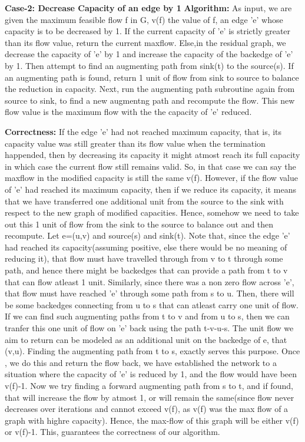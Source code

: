 \documentclass{article}
\newcommand\algo{\vspace{.10in}\textbf{Algorithm: }}
\newcommand\correctness{\vspace{.10in}\textbf{Correctness: }}
\begin{document}
    \textbf {Case-2: Decrease Capacity of an edge by 1} \newline    
    \algo As input, we are given the maximum feasible flow f in G, v(f) the value of f, an edge 'e' whose capacity is to be decreased by 1. If the current capacity of 'e' is strictly greater than its flow value, return the current maxflow. Else,in the residual graph, we decrease the capacity of 'e' by 1 and increase the capacity of the backedge of 'e' by 1. Then attempt to find an augmenting path from sink(t) to the source(s). If an augmenting path is found, return 1 unit of flow from sink to source to balance the reduction in capacity. Next, run the augmenting path subroutine again from source to sink, to find a new augmentng path and recompute the flow. This new flow value is the maximum flow with the the capacity of 'e' reduced. \newline

    \correctness If the edge 'e' had not reached maximum capacity, that is, its capacity value was still greater than its flow value when the termination happended, then by decreasing its capacity it might atmost reach its full capacity in which case the current flow still remains valid. So, in that case we can say the maxflow in the modified capacity is still the same v(f). However, if the flow value of 'e' had reached its maximum capacity, then if we reduce its capacity, it means that we have transferred one additional unit from the source to the sink with respect to the new graph of modified capacities. Hence, somehow we need to take out this 1 unit of flow from the sink to the source to balance out and then recompute. Let e=(u,v) and source(s) and sink(t). Note that, since the edge 'e' had reached its capacity(assuming positive, else there would be no meaning of reducing it), that flow must have travelled through from v to t through some path, and hence there might be backedges that can provide a path from t to v that can flow atleast 1 unit. Similarly, since there was a non zero flow across 'e', that flow must have reached 'e' through some path from s to u. Then, there will be some backedges connecting from u to s that can atleast carry one unit of flow. If we can find such augmenting paths from t to v and from u to s, then we can tranfer this one unit of flow on 'e' back using the path t-v-u-s. The unit flow we aim to return can be modeled as an additional unit on the backedge of e, that (v,u). Finding the augmenting path from t to s, exactly serves this purpose. Once , we do this and return the flow back, we have established the network to a situation where the capacity of 'e' is reduced by 1, and the flow would have been v(f)-1. Now we try finding a forward augmenting path from s to t, and if found, that will increase the flow by atmost 1, or will remain the same(since flow never decreases over iterations and cannot exceed v(f), as v(f) was the max flow of a graph with highre capacity). Hence, the max-flow of this graph will be either v(f) or v(f)-1. This, guarantees the correctness of our algorithm. 
    
    
 
\end{document}
